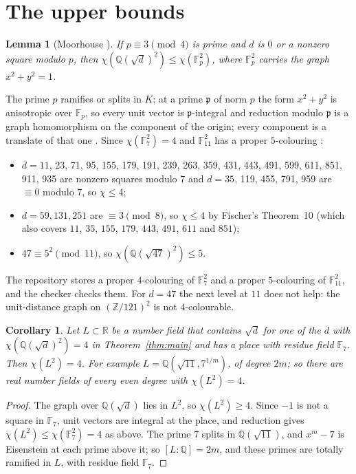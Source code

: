 \documentclass[11pt,a4paper]{amsart}
\newtheorem{corollary}[theorem]{Corollary}
\newtheorem{lemma}[theorem]{Lemma}
\theoremstyle{remark}
\newcommand{\F}{\mathbb{F}}
\newcommand{\Q}{\mathbb{Q}}
\newcommand{\R}{\mathbb{R}}
\newcommand{\Z}{\mathbb{Z}}
\newcommand{\p}{\mathfrak{p}}
\begin{document}
\section{The upper bounds}\label{sec:upper}

\begin{lemma}[Moorhouse {\cite[Lemma~8.2]{Moorhouse}}]
If $p\equiv3\pmod4$ is prime and $d$ is $0$ or a nonzero square modulo $p$, then
$\chi(\Q(\sqrt d)^2)\le\chi(\F_p^2)$, where $\F_p^2$ carries the graph $x^2+y^2=1$.
\end{lemma}

The prime $p$ ramifies or splits in $K$; at a prime $\p$ of norm $p$ the form $x^2+y^2$ is anisotropic over
$\F_p$, so every unit vector is $\p$-integral and reduction modulo $\p$ is a graph homomorphism on the
component of the origin; every component is a translate of that one \cite[Lemma~4.2]{Moorhouse}. Since
$\chi(\F_7^2)=4$ \cite[Table~6.1]{Moorhouse} and $\F_{11}^2$ has a proper
$5$-colouring \cite[Lemma~4.5]{Madore}:
\begin{itemize}
\item $d=11$, 23, 71, 95, 155, 179, 191, 239, 263, 359, 431, 443, 491, 599, 611, 851, 911, 935 are nonzero squares
  modulo $7$ and
  $d=35$, 119, 455, 791, 959 are $\equiv0$ modulo $7$, so $\chi\le4$;
\item $d=59,131,251$ are $\equiv3\pmod8$, so $\chi\le4$ by Fischer's Theorem~10 (which also covers $11$, $35$,
  $155$, $179$, $443$, $491$, $611$ and $851$);
\item $47\equiv5^2\pmod{11}$, so $\chi(\Q(\sqrt{47})^2)\le5$.
\end{itemize}
The repository stores a proper $4$-colouring of $\F_7^2$ and a proper $5$-colouring of $\F_{11}^2$, and the
checker checks them. For $d=47$ the next level at $11$ does not help: the unit-distance graph on
$(\Z/121)^2$ is not $4$-colourable.

\begin{corollary}\label{cor:larger}
Let $L\subset\R$ be a number field that contains $\sqrt d$ for one of the $d$ with $\chi(\Q(\sqrt d)^2)=4$ in
Theorem~\ref{thm:main} and has a place with residue field $\F_7$. Then $\chi(L^2)=4$. For example
$L=\Q(\sqrt{11},7^{1/m})$, of degree $2m$; so there are real number fields of every even degree with
$\chi(L^2)=4$.
\end{corollary}

\begin{proof}
The graph over $\Q(\sqrt d)$ lies in $L^2$, so $\chi(L^2)\ge4$. Since $-1$ is not a square in $\F_7$, unit
vectors are integral at the place, and reduction gives $\chi(L^2)\le\chi(\F_7^2)=4$ as above. The prime $7$
splits in $\Q(\sqrt{11})$, and $x^m-7$ is Eisenstein at each prime above it; so $[L:\Q]=2m$, and these
primes are totally ramified in $L$, with residue field $\F_7$.
\end{proof}
\end{document}
